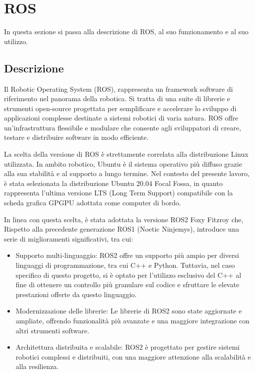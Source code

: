 \section{ROS}
In questa sezione si passa alla descrizione di ROS, al suo funzionamento e al suo utilizzo.

\subsection{Descrizione}
Il Robotic Operating System (ROS), rappresenta un framework software di riferimento nel panorama della robotica. Si tratta di una suite di librerie e strumenti open-source progettata per semplificare e accelerare lo sviluppo di applicazioni complesse destinate a sistemi robotici di varia natura. ROS offre un'infrastruttura flessibile e modulare che consente agli sviluppatori di creare, testare e distribuire software in modo efficiente.

\noindent La scelta della versione di ROS è strettamente correlata alla distribuzione Linux utilizzata. In ambito robotico, Ubuntu è il sistema operativo più diffuso grazie alla sua stabilità e al supporto a lungo termine. Nel contesto del presente lavoro, è stata selezionata la distribuzione Ubuntu 20.04 Focal Fossa, in quanto rappresenta l'ultima versione LTS (Long Term Support) compatibile con la scheda grafica GPGPU adottata come computer di bordo.

\noindent In linea con questa scelta, è stata adottata la versione ROS2 Foxy Fitzroy che, Rispetto alla precedente generazione ROS1 (Noetic Ninjemys), introduce una serie di miglioramenti significativi, tra cui:

\begin{itemize}
  \item Supporto multi-linguaggio: ROS2 offre un supporto più ampio per diversi linguaggi di programmazione, tra cui C++ e Python. Tuttavia, nel caso specifico di questo progetto, si è optato per l'utilizzo esclusivo del C++ al fine di ottenere un controllo più granulare sul codice e sfruttare le elevate prestazioni offerte da questo linguaggio.
  \item Modernizzazione delle librerie: Le librerie di ROS2 sono state aggiornate e ampliate, offrendo funzionalità più avanzate e una maggiore integrazione con altri strumenti software.
  \item Architettura distribuita e scalabile: ROS2 è progettato per gestire sistemi robotici complessi e distribuiti, con una maggiore attenzione alla scalabilità e alla resilienza.
\end{itemize}

